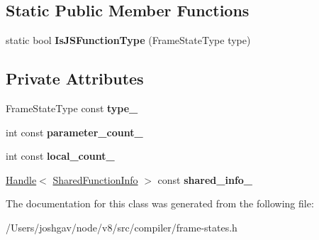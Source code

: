 \subsection*{Static Public Member Functions}
\begin{DoxyCompactItemize}
\item 
static bool {\bfseries Is\+J\+S\+Function\+Type} (Frame\+State\+Type type)\hypertarget{classv8_1_1internal_1_1compiler_1_1_frame_state_function_info_a78154f20863a58417e547c83a32d0de2}{}\label{classv8_1_1internal_1_1compiler_1_1_frame_state_function_info_a78154f20863a58417e547c83a32d0de2}

\end{DoxyCompactItemize}
\subsection*{Private Attributes}
\begin{DoxyCompactItemize}
\item 
Frame\+State\+Type const {\bfseries type\+\_\+}\hypertarget{classv8_1_1internal_1_1compiler_1_1_frame_state_function_info_a43b5cb859bfe2e142eb9aef12082d00d}{}\label{classv8_1_1internal_1_1compiler_1_1_frame_state_function_info_a43b5cb859bfe2e142eb9aef12082d00d}

\item 
int const {\bfseries parameter\+\_\+count\+\_\+}\hypertarget{classv8_1_1internal_1_1compiler_1_1_frame_state_function_info_a79ccf0b4d0e3fe311319d4a58c8f0f61}{}\label{classv8_1_1internal_1_1compiler_1_1_frame_state_function_info_a79ccf0b4d0e3fe311319d4a58c8f0f61}

\item 
int const {\bfseries local\+\_\+count\+\_\+}\hypertarget{classv8_1_1internal_1_1compiler_1_1_frame_state_function_info_a59c0664c9adaec96d7dc1d506c8c05a6}{}\label{classv8_1_1internal_1_1compiler_1_1_frame_state_function_info_a59c0664c9adaec96d7dc1d506c8c05a6}

\item 
\hyperlink{classv8_1_1internal_1_1_handle}{Handle}$<$ \hyperlink{classv8_1_1internal_1_1_shared_function_info}{Shared\+Function\+Info} $>$ const {\bfseries shared\+\_\+info\+\_\+}\hypertarget{classv8_1_1internal_1_1compiler_1_1_frame_state_function_info_a5be87787bf685a67aef4fb48c13e4a4f}{}\label{classv8_1_1internal_1_1compiler_1_1_frame_state_function_info_a5be87787bf685a67aef4fb48c13e4a4f}

\end{DoxyCompactItemize}


The documentation for this class was generated from the following file\+:\begin{DoxyCompactItemize}
\item 
/\+Users/joshgav/node/v8/src/compiler/frame-\/states.\+h\end{DoxyCompactItemize}
